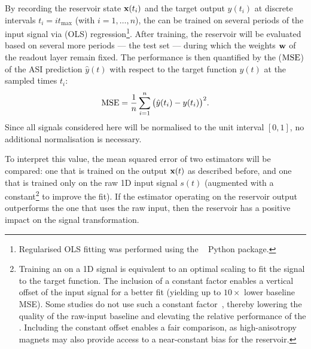 By recording the reservoir state $\boldsymbol{\mathbf{x}}(t_i)$ and the target output $y(t_i)$ at discrete intervals $t_i = i t_\mathrm{max}$ (with $i = 1,\dots,n$), the  can be trained on several periods of the input signal via  (OLS) regression\footnote{
	Regularised OLS fitting was performed using the ~\cite{statsmodels} Python package.
}.
After training, the reservoir will be evaluated based on several more periods --- the test set --- during which the weights $\boldsymbol{\mathbf{w}}$ of the readout layer remain fixed.
The performance is then quantified by the  ($\mathrm{MSE}$) of the ASI prediction $\hat{y}(t)$ with respect to the target function $y(t)$ at the sampled times $t_i$:
\begin{equation}
	\label{eq:3:MSE}
	\mathrm{MSE} = \frac{1}{n} \sum_{i=1}^n \big(\hat{y}(t_i) - y(t_i)\big)^2 \mathrm{.}
\end{equation}
Since all signals considered here will be normalised to the unit interval $[0,1]$, no additional normalisation is necessary. \par
To interpret this value, the mean squared error of two estimators will be compared: one that is trained on the  output $\boldsymbol{\mathbf{x}}(t)$ as described before, and one that is trained only on the raw 1D input signal $s(t)$ (augmented with a constant\footnote{
	Training an  on a 1D signal is equivalent to an optimal scaling to fit the signal to the target function.
	The inclusion of a constant factor enables a vertical offset of the input signal for a better fit (yielding up to $10 \times$ lower baseline MSE).
	Some studies do not use such a constant factor~\cite{gartside2022reconfigurable}, thereby lowering the quality of the raw-input baseline and elevating the relative performance of the .
	Including the constant offset enables a fair comparison, as high-anisotropy magnets may also provide access to a near-constant bias for the reservoir.
} to improve the fit).
If the estimator operating on the reservoir output outperforms the one that uses the raw input, then the reservoir has a positive impact on the signal transformation.

